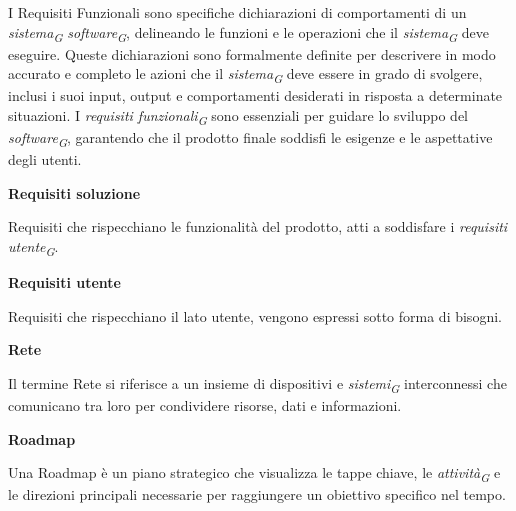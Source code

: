 \documentclass{article}
\begin{document}
I Requisiti Funzionali sono specifiche dichiarazioni di comportamenti di un \textit{sistema}\textsubscript{\textit{G}} \textit{software}\textsubscript{\textit{G}}, delineando le funzioni e le operazioni che il \textit{sistema}\textsubscript{\textit{G}} deve eseguire. Queste dichiarazioni sono formalmente definite per descrivere in modo accurato e completo le azioni che il \textit{sistema}\textsubscript{\textit{G}} deve essere in grado di svolgere, inclusi i suoi input, output e comportamenti desiderati in risposta a determinate situazioni. I \textit{requisiti funzionali}\textsubscript{\textit{G}} sono essenziali per guidare lo sviluppo del \textit{software}\textsubscript{\textit{G}}, garantendo che il prodotto finale soddisfi le esigenze e le aspettative degli utenti.

\vspace{0.4cm}

\textbf{Requisiti soluzione}

\vspace{0.1cm}

Requisiti che rispecchiano le funzionalità del prodotto, atti a soddisfare i \textit{requisiti utente}\textsubscript{\textit{G}}.

\vspace{0.4cm}

\textbf{Requisiti utente}

\vspace{0.1cm}

Requisiti che rispecchiano il lato utente, vengono espressi sotto forma di bisogni.

\vspace{0.4cm}

\textbf{Rete}

\vspace{0.1cm}

Il termine Rete si riferisce a un insieme di dispositivi e \textit{sistemi}\textsubscript{\textit{G}} interconnessi che comunicano tra loro per condividere risorse, dati e informazioni.

\vspace{0.4cm}

\textbf{Roadmap}

\vspace{0.1cm}

Una Roadmap è un piano strategico che visualizza le tappe chiave, le \textit{attività}\textsubscript{\textit{G}} e le direzioni principali necessarie per raggiungere un obiettivo specifico nel tempo.
\end{document}
